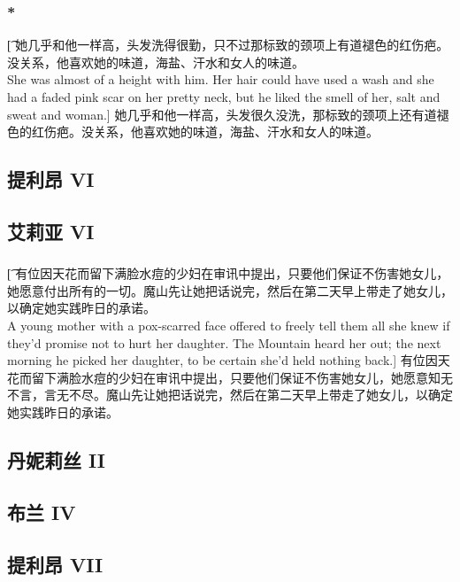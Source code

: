 \documentclass[12pt,a4paper]{article}
\begin{document}
\subsubsection{\color{red}*}\t[
	她几乎和他一样高，头发洗得很勤，只不过那标致的颈项上有道褪色的红伤疤。没关系，他喜欢她的味道，海盐、汗水和女人的味道。\\
	She was almost of a height with him. Her hair could have used a wash and she had a faded pink scar on her pretty neck, but he liked the smell of her, salt and sweat and woman.]
	她几乎和他一样高，头发很久没洗，那标致的颈项上还有道褪色的红伤疤。没关系，他喜欢她的味道，海盐、汗水和女人的味道。
	
\subsection{提利昂 VI}

\subsection{艾莉亚 VI}
\subsubsection{}\t[
	有位因天花而留下满脸水痘的少妇在审讯中提出，只要他们保证不伤害她女儿，她愿意付出所有的一切。魔山先让她把话说完，然后在第二天早上带走了她女儿，以确定她实践昨日的承诺。\\
	A young mother with a pox-scarred face offered to freely tell them all she knew if they'd promise not to hurt her daughter. The Mountain heard her out; the next morning he picked her daughter, to be certain she'd held nothing back.]
	有位因天花而留下满脸水痘的少妇在审讯中提出，只要他们保证不伤害她女儿，她愿意知无不言，言无不尽。魔山先让她把话说完，然后在第二天早上带走了她女儿，以确定她实践昨日的承诺。
	
\subsection{丹妮莉丝 II}

\subsection{布兰 IV}

\subsection{提利昂 VII}
\end{document}

